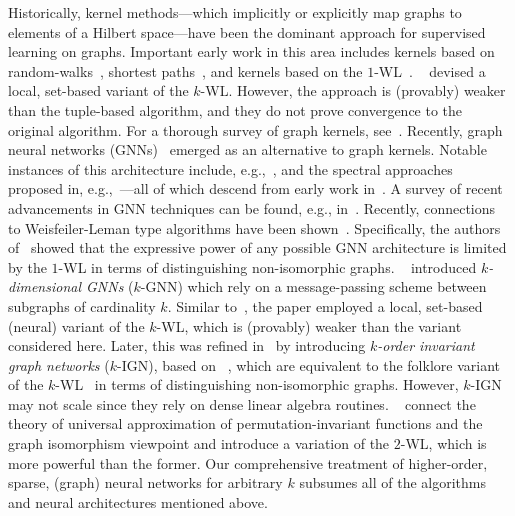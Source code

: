 \documentclass{article}
\theoremstyle{definition}
\newcommand{\wl}{$1$-\textsf{WL}\xspace}
\newcommand{\kwl}{$k$-\textsf{WL}\xspace}
\newcommand{\kgnn}{$k$\textrm{-}\textsf{GNN}\xspace}
\newcommand{\kign}{$k$\textrm{-}\textsf{IGN}\xspace}
\begin{document}
Historically, kernel methods---which implicitly or explicitly map graphs to elements of a Hilbert space---have been the dominant approach for supervised learning on graphs. Important early work in this area includes kernels based on random-walks~\cite{Gae+2003,Kas+2003,Kri+2017b}, shortest paths~\cite{Bor+2005}, and kernels based on the \wl~\cite{She+2011}. \citeauthor{Mor+2017}~\cite{Mor+2017} devised a local, set-based variant of the \kwl. However, the approach is (provably) weaker than the tuple-based algorithm, and they do not prove convergence to the original algorithm. For a thorough survey of graph kernels, see~\cite{Kri+2019}. Recently, graph neural networks (GNNs)~\cite{Gil+2017,Sca+2009} emerged as an alternative to graph kernels. Notable instances of this architecture include, e.g.,~\cite{Duv+2015,Ham+2017,Vel+2018}, and the spectral approaches proposed in, e.g.,~\cite{Bru+2014,Def+2015,Kip+2017,Mon+2017}---all of which descend from early work in~\cite{Kir+1995,Mer+2005,Spe+1997,Sca+2009}. A survey of recent advancements in GNN techniques can be found, e.g., in~\cite{Cha+2020,Wu+2019,Zho+2018}. Recently, connections to Weisfeiler-Leman type algorithms have been shown~\cite{Bar+2020,Che+2019,Gee+2020a,Gee+2020b,Mae+2019,Mar+2019,Mor+2019,Xu+2018b}. Specifically, the authors of~\cite{Mor+2019,Xu+2018b} showed that the expressive power of any possible GNN architecture is limited by the \wl in terms of distinguishing non-isomorphic graphs. \citeauthor{Mor+2019}~\cite{Mor+2019} introduced \emph{$k$-dimensional GNNs} (\kgnn) which rely on a message-passing scheme between subgraphs of cardinality $k$. Similar to~\cite{Mor+2017}, the paper employed a local, set-based (neural) variant of the \kwl, which is (provably) weaker than the variant considered here. Later, this was refined in~\cite{Mar+2019} by introducing \emph{$k$-order invariant graph networks} (\kign), based on \citeauthor{Mar+2019b}~\cite{Mar+2019b}, which are equivalent to the folklore variant of the \kwl~\cite{Gee+2020b,Gro2017} in terms of distinguishing non-isomorphic graphs. However, \kign may not scale since they rely on dense linear algebra routines. \citeauthor{Che+2019}~\cite{Che+2019} connect the theory of universal approximation of permutation-invariant functions and the graph isomorphism viewpoint and introduce a variation of the $2$-\textsf{WL}, which is more powerful than the former. Our comprehensive treatment of higher-order, sparse, (graph) neural networks for arbitrary $k$ subsumes all of the algorithms and neural architectures mentioned above.
\end{document}
